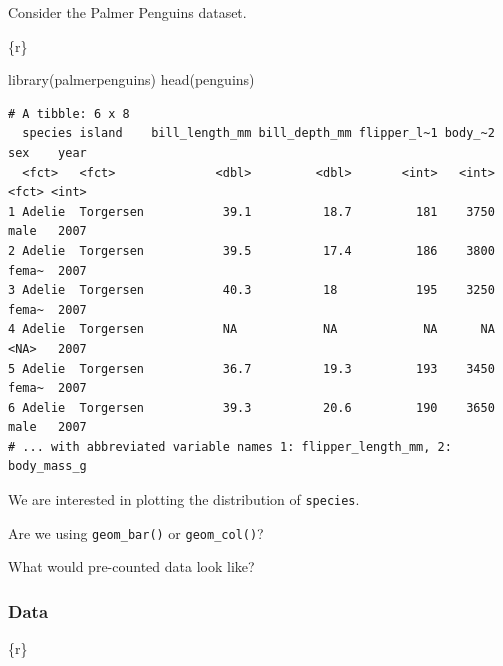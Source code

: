 \documentclass[
  letterpaper,
  DIV=11,
  numbers=noendperiod]{scrreprt}
\newenvironment{Shaded}{\begin{snugshade}}{\end{snugshade}}
\newcommand{\FunctionTok}[1]{\textcolor[rgb]{0.28,0.35,0.67}{#1}}
\newcommand{\InformationTok}[1]{\textcolor[rgb]{0.37,0.37,0.37}{#1}}
\newcommand{\NormalTok}[1]{\textcolor[rgb]{0.00,0.23,0.31}{#1}}
\begin{document}
\begin{tcolorbox}[enhanced jigsaw, colframe=quarto-callout-note-color-frame, breakable, colback=white, toprule=.15mm, leftrule=.75mm, left=2mm, opacityback=0, rightrule=.15mm, arc=.35mm, bottomrule=.15mm]

Consider the Palmer Penguins dataset.

\begin{Shaded}
\begin{Highlighting}[]
\InformationTok{\textasciigrave{}\textasciigrave{}\textasciigrave{}\{r\}}

\FunctionTok{library}\NormalTok{(palmerpenguins)}
\FunctionTok{head}\NormalTok{(penguins)}
\InformationTok{\textasciigrave{}\textasciigrave{}\textasciigrave{}}
\end{Highlighting}
\end{Shaded}

\begin{verbatim}
# A tibble: 6 x 8
  species island    bill_length_mm bill_depth_mm flipper_l~1 body_~2 sex    year
  <fct>   <fct>              <dbl>         <dbl>       <int>   <int> <fct> <int>
1 Adelie  Torgersen           39.1          18.7         181    3750 male   2007
2 Adelie  Torgersen           39.5          17.4         186    3800 fema~  2007
3 Adelie  Torgersen           40.3          18           195    3250 fema~  2007
4 Adelie  Torgersen           NA            NA            NA      NA <NA>   2007
5 Adelie  Torgersen           36.7          19.3         193    3450 fema~  2007
6 Adelie  Torgersen           39.3          20.6         190    3650 male   2007
# ... with abbreviated variable names 1: flipper_length_mm, 2: body_mass_g
\end{verbatim}

We are interested in plotting the distribution of \texttt{species}.

Are we using \texttt{geom\_bar()} or \texttt{geom\_col()}?

What would pre-counted data look like?

\hypertarget{data-3}{%
\subsubsection*{Data}\label{data-3}}

\begin{Shaded}
\begin{Highlighting}[]
\InformationTok{\textasciigrave{}\textasciigrave{}\textasciigrave{}\{r\}}


\end{Highlighting}
\end{Shaded}
\end{tcolorbox}
\end{document}
